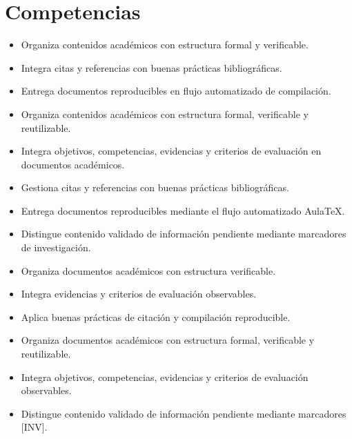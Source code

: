 \documentclass[12pt]{article}
\begin{document}
\section*{Competencias}
\begin{itemize}[leftmargin=*]
  \item Organiza contenidos académicos con estructura formal y verificable.
  \item Integra citas y referencias con buenas prácticas bibliográficas.
  \item Entrega documentos reproducibles en flujo automatizado de compilación.
  \item Organiza contenidos académicos con estructura formal, verificable y reutilizable.
  \item Integra objetivos, competencias, evidencias y criterios de evaluación en documentos académicos.
  \item Gestiona citas y referencias con buenas prácticas bibliográficas.
  \item Entrega documentos reproducibles mediante el flujo automatizado AulaTeX.
  \item Distingue contenido validado de información pendiente mediante marcadores de investigación.
  \item Organiza documentos académicos con estructura verificable.
  \item Integra evidencias y criterios de evaluación observables.
  \item Aplica buenas prácticas de citación y compilación reproducible.
  \item Organiza documentos académicos con estructura formal, verificable y reutilizable.
  \item Integra objetivos, competencias, evidencias y criterios de evaluación observables.
  \item Distingue contenido validado de información pendiente mediante marcadores [INV].
\end{itemize}
\end{document}
